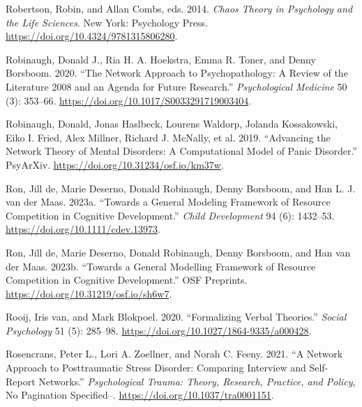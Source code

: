 \documentclass[
  a4paper,
  DIV=11,
  numbers=noendperiod]{scrreprt}
\newlength{\cslhangindent}
\newlength{\cslentryspacingunit} %
\newenvironment{CSLReferences}[2] %
 {%
  \setlength{\parindent}{0pt}
  \ifodd #1
  \let\oldpar\par
  \def\par{\hangindent=\cslhangindent\oldpar}
  \fi
  \setlength{\parskip}{#2\cslentryspacingunit}
 }%
 {}
\begin{document}
\begin{CSLReferences}{1}{0}
\leavevmode{}%
Robertson, Robin, and Allan Combs, eds. 2014. \emph{Chaos Theory in
{Psychology} and the {Life Sciences}}. {New York}: {Psychology Press}.
\url{https://doi.org/10.4324/9781315806280}.

\leavevmode{}%
Robinaugh, Donald J., Ria H. A. Hoekstra, Emma R. Toner, and Denny
Borsboom. 2020. {``The Network Approach to Psychopathology: A Review of
the Literature 2008 and an Agenda for Future
Research.''} \emph{Psychological Medicine} 50 (3): 353--66.
\url{https://doi.org/10.1017/S0033291719003404}.

\leavevmode{}%
Robinaugh, Donald, Jonas Haslbeck, Lourens Waldorp, Jolanda Kossakowski,
Eiko I. Fried, Alex Millner, Richard J. McNally, et al. 2019.
{``Advancing the {Network Theory} of {Mental Disorders}: {A
Computational Model} of {Panic Disorder}.''} {PsyArXiv}.
\url{https://doi.org/10.31234/osf.io/km37w}.

\leavevmode{}%
Ron, Jill de, Marie Deserno, Donald Robinaugh, Denny Borsboom, and Han
L. J. van der Maas. 2023a. {``Towards a General Modeling Framework of
Resource Competition in Cognitive Development.''} \emph{Child
Development} 94 (6): 1432--53. \url{https://doi.org/10.1111/cdev.13973}.

\leavevmode{}%
Ron, Jill de, Marie Deserno, Donald Robinaugh, Denny Borsboom, and Han
van der Maas. 2023b. {``Towards a {General Modelling Framework} of
{Resource Competition} in {Cognitive Development}.''} {OSF Preprints}.
\url{https://doi.org/10.31219/osf.io/sh6w7}.

\leavevmode{}%
Rooij, Iris van, and Mark Blokpoel. 2020. {``Formalizing Verbal
Theories.''} \emph{Social Psychology} 51 (5): 285--98.
\url{https://doi.org/10.1027/1864-9335/a000428}.

\leavevmode{}%
Rosencrans, Peter L., Lori A. Zoellner, and Norah C. Feeny. 2021. {``A
Network Approach to Posttraumatic Stress Disorder: {Comparing} Interview
and Self-Report Networks.''} \emph{Psychological Trauma: Theory,
Research, Practice, and Policy}, No Pagination Specified--.
\url{https://doi.org/10.1037/tra0001151}.


\end{CSLReferences}
\end{document}
